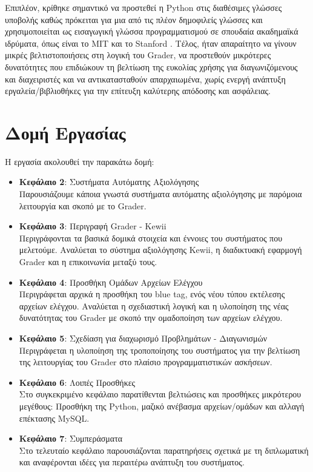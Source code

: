\documentclass[diploma]{softlab-thesis}
\begin{document}
\bigskip

Επιπλέον, κρίθηκε σημαντικό να προστεθεί η Python στις διαθέσιμες γλώσσες
υποβολής καθώς πρόκειται για μια από τις πλέον δημοφιλείς γλώσσες και
χρησιμοποιείται ως εισαγωγική γλώσσα προγραμματισμού σε σπουδαία ακαδημαϊκά
ιδρύματα, όπως είναι το MIT και το Stanford \cite{popularpython}.
Τέλος, ήταν απαραίτητο να γίνουν μικρές βελτιστοποιήσεις στη λογική του Grader,
να προστεθούν μικρότερες δυνατότητες που επιδιώκουν τη βελτίωση της ευκολίας
χρήσης για διαγωνιζόμενους και διαχειριστές και να αντικατασταθούν
απαρχαιωμένα, χωρίς ενεργή ανάπτυξη εργαλεία/βιβλιοθήκες για την επίτευξη
καλύτερης απόδοσης και ασφάλειας.

\newpage

\section{Δομή Εργασίας}

Η εργασία ακολουθεί την παρακάτω δομή:

\begin{itemize}
  \item \textbf{Κεφάλαιο 2}: Συστήματα Αυτόματης Αξιολόγησης \\
    Παρουσιάζουμε κάποια γνωστά συστήματα αυτόματης αξιολόγησης με παρόμοια
    λειτουργία και σκοπό με το Grader.
  \item \textbf{Κεφάλαιο 3}: Περιγραφή Grader - Kewii \\
    Περιγράφονται τα βασικά δομικά στοιχεία και έννοιες του συστήματος που
    μελετούμε. Αναλύεται το σύστημα αξιολόγησης Kewii, η διαδικτυακή
    εφαρμογή Grader και η επικοινωνία μεταξύ τους.
  \item \textbf{Κεφάλαιο 4}: Προσθήκη Ομάδων Αρχείων Ελέγχου \\
    Περιγράφεται αρχικά η προσθήκη του blue tag, ενός νέου τύπου εκτέλεσης
    αρχείων ελέγχου. Αναλύεται η σχεδιαστική λογική και η υλοποίηση της νέας
    δυνατότητας του Grader με σκοπό την ομαδοποίηση των αρχείων ελέγχου.
  \item \textbf{Κεφάλαιο 5}: Σχεδίαση για διαχωρισμό Προβλημάτων - Διαγωνισμών \\
    Περιγράφεται η υλοποίηση της τροποποίησης του συστήματος για την βελτίωση
    της λειτουργίας του Grader στο πλαίσιο προγραμματιστικών ασκήσεων.
  \item \textbf{Κεφάλαιο 6}: Λοιπές Προσθήκες \\
    Στο συγκεκριμένο κεφάλαιο παρατίθενται βελτιώσεις και προσθήκες μικρότερου
    μεγέθους: Προσθήκη της Python, μαζικό ανέβασμα αρχείων/ομάδων και αλλαγή
    επέκτασης MySQL.
  \item \textbf{Κεφάλαιο 7}: Συμπεράσματα \\
    Στο τελευταίο κεφάλαιο παρουσιάζονται παρατηρήσεις σχετικά με τη
    διπλωματική και αναφέρονται ιδέες για περαιτέρω ανάπτυξη του συστήματος.
\end{itemize}
\end{document}
